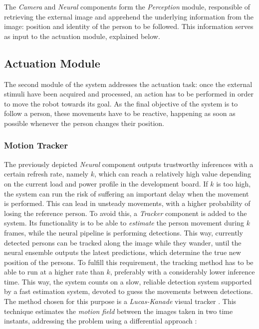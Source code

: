 The \textit{Camera} and \textit{Neural} components form the \textit{Perception} module, responsible of retrieving the external image and apprehend the underlying information from the image: position and identity of the person to be followed. This information serves as input to the actuation module, explained below.


\subsection{Actuation Module}

The second module of the system addresses the actuation task: once the external stimuli have been acquired and processed, an action has to be performed in order to move the robot towards its goal. As the final objective of the system is to follow a person, these movements have to be reactive, happening as soon as possible whenever the person changes their position.\\

\subsubsection{Motion Tracker}

The previously depicted \textit{Neural} component outputs trustworthy inferences with a certain refresh rate, namely $k$, which can reach a relatively high value depending on the current load and power profile in the development board. If $k$ is too high, the system can run the risk of suffering an important delay when the movement is performed. This can lead in unsteady movements, with a higher probability of losing the reference person. To avoid this, a \textit{Tracker} component is added to the system. Its functionality is to be able to \textit{estimate} the person movement during $k$ frames, while the neural pipeline is performing detections. This way, currently detected persons can be tracked along the image while they wander, until the neural ensemble outputs the latest predictions, which determine the true new position of the persons. To fulfill this requirement, the tracking method has to be able to run at a higher rate than $k$, preferably with a considerably lower inference time. This way, the system counts on a slow, reliable detection system supported by a fast estimation system, devoted to guess the movements between detections.\\

The method chosen for this purpose is a \textit{Lucas-Kanade} visual tracker \cite{diapos_cv_motion_estimation}.  This technique estimates the \textit{motion field} between the images taken in two time instants, addressing the problem using a differential approach \cite{lucas_kanade}:

